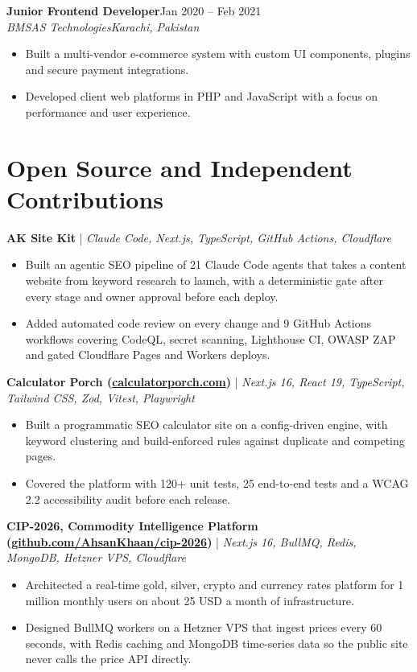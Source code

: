 \documentclass[10.5pt,a4paper]{article}
\newcommand{\role}[4]{%
  \vspace{4pt}\textbf{#1}\hfill #2\\
  \textit{#3}\hfill \textit{#4}\par\vspace{1pt}}
\newcommand{\project}[2]{\vspace{4pt}\textbf{#1} | \textit{#2}\par}
\begin{document}
\role{Junior Frontend Developer}{Jan 2020 -- Feb 2021}{BMSAS Technologies}{Karachi, Pakistan}
\begin{itemize}
  \item Built a multi-vendor e-commerce system with custom UI components, plugins and secure payment integrations.
  \item Developed client web platforms in PHP and JavaScript with a focus on performance and user experience.
\end{itemize}

\section{Open Source and Independent Contributions}

\project{AK Site Kit}{Claude Code, Next.js, TypeScript, GitHub Actions, Cloudflare}
\begin{itemize}
  \item Built an agentic SEO pipeline of 21 Claude Code agents that takes a content website from keyword research to launch, with a deterministic gate after every stage and owner approval before each deploy.
  \item Added automated code review on every change and 9 GitHub Actions workflows covering CodeQL, secret scanning, Lighthouse CI, OWASP ZAP and gated Cloudflare Pages and Workers deploys.
\end{itemize}

\project{Calculator Porch (\href{https://calculatorporch.com}{calculatorporch.com})}{Next.js 16, React 19, TypeScript, Tailwind CSS, Zod, Vitest, Playwright}
\begin{itemize}
  \item Built a programmatic SEO calculator site on a config-driven engine, with keyword clustering and build-enforced rules against duplicate and competing pages.
  \item Covered the platform with 120+ unit tests, 25 end-to-end tests and a WCAG 2.2 accessibility audit before each release.
\end{itemize}

\project{CIP-2026, Commodity Intelligence Platform (\href{https://github.com/AhsanKhaan/cip-2026}{github.com/AhsanKhaan/cip-2026})}{Next.js 16, BullMQ, Redis, MongoDB, Hetzner VPS, Cloudflare}
\begin{itemize}
  \item Architected a real-time gold, silver, crypto and currency rates platform for 1 million monthly users on about 25 USD a month of infrastructure.
  \item Designed BullMQ workers on a Hetzner VPS that ingest prices every 60 seconds, with Redis caching and MongoDB time-series data so the public site never calls the price API directly.
\end{itemize}
\end{document}

